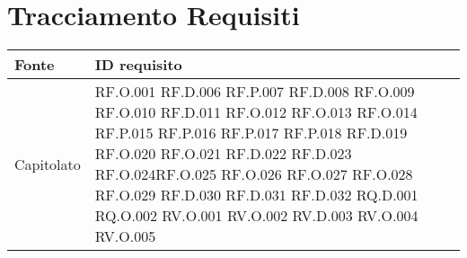 \section{Tracciamento Requisiti}

    \begin{longtable}{|C{3.0cm}|C{3.0cm}|}
        \hline
         \textbf{Fonte} &
         \textbf{ID requisito}   
          \\
          \hline
          Capitolato & RF.O.001  \newline RF.D.006 \newline   
                        RF.P.007 \newline  RF.D.008 \newline
                        RF.O.009  \newline RF.O.010 \newline
                        RF.D.011   \newline      RF.O.012 \newline
                        RF.O.013  \newline       RF.O.014 \newline
                        RF.P.015  \newline        RF.P.016 \newline
                        RF.P.017  \newline        RF.P.018 \newline
                        RF.D.019   \newline      RF.O.020 \newline
RF.O.021 \newline RF.D.022 \newline RF.D.023  \newline  RF.O.024\newline RF.O.025 \newline
RF.O.026 \newline RF.O.027  \newline RF.O.028  \newline  RF.O.029 \newline RF.D.030 \newline RF.D.031 \newline RF.D.032 \newline
RQ.D.001 \newline RQ.O.002 \newline 
RV.O.001 \newline RV.O.002  \newline RV.D.003   \newline  RV.O.004   \newline RV.O.005 \newline

\end{longtable}
